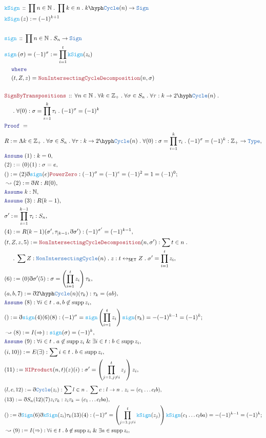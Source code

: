 \documentclass[12pt]{scrartcl}
\newcommand{\TYPE}[1]{\textcolor{NavyBlue}{\mathtt{#1}}}
\newcommand{\FUNC}[1]{\textcolor{Cerulean}{\mathtt{#1}}}
\newcommand{\LOGIC}[1]{\textcolor{Blue}{\mathtt{#1}}}
\newcommand{\THM}[1]{\textcolor{Maroon}{\mathtt{#1}}}
\renewcommand{\.}{\; . \;}
\newcommand{\de}{: \kern 0.1pc =}
\newcommand{\where}{\LOGIC{where}}
\newcommand{\Act}[1]{\left( #1 \right)}
\newcommand{\Theorem}[2]{& \THM{#1} \, :: \, #2 \\ & \Proof = \\ }
\newcommand{\DeclareFunc}[2]{& \FUNC{#1} \, :: \, #2 \\}
\newcommand{\DefineFunc}[3]{&  \FUNC{#1}\Act{#2} \de #3 \\}
\newcommand{\DefineNamedFunc}[4]{&  \FUNC{#1}\Act{#2} = #3 \de #4 \\}
\newcommand{\NewLine}{\\ & \kern 1pc}
\newcommand{\Page}[1]{ \begin{align*} #1 \end{align*}   }
\newcommand{ \bd }{ \ByDef }
\renewcommand{\And}{\; \& \;}
\newcommand{\Type}{\TYPE{Type}}
\newcommand{\NNInt}{\mathbb{Z}_{+} }
\newcommand{\Nat}{\mathbb{N} }
\DeclareMathOperator*{\supp}{supp}
\newcommand{\ToBij}{\leftrightarrow}
\newcommand{\Say}[3]{& #1 \de #2 : #3, \\}
\newcommand{\Conclude}[3]{& #1 \de #2 : #3; \\}
\newcommand{\Derive}[3]{& \leadsto #1 \de #2 : #3, \\}
\newcommand{\Assume}[2]{& \LOGIC{Assume} \; #1 : #2, \\}
\newcommand{\ByDef}{\eth}
\newcommand{\Proof}{\LOGIC{Proof} \; }
\newcommand{\SET}{\mathsf{SET}}
\begin{document}
\Page{
	\DeclareFunc{kSign}{\prod n \in \Nat \. \prod k \in n \. k\hyph \TYPE{Cycle}(n) \to \TYPE{Sign}}
	\DefineFunc{kSign}{z}{(-1)^{k+1}}
	\\
	\DeclareFunc{sign}{\prod n \in \Nat \. S_n \to \TYPE{Sign}}
	\DefineNamedFunc{sign}{\sigma}{(-1)^\sigma}{\prod^t_{i=1} \FUNC{kSign}(z_i) 
	\NewLine \where \NewLine
	(t,Z,z) = \THM{NonIntersectingCycleDecomposition}(n,\sigma)
	}
	\\
	\Theorem{SignByTranspositions}{\forall n \in \Nat \. \forall k \in \NNInt \. \forall \sigma \in S_n \.
		\forall \tau : k \to 2\hyph\TYPE{Cycle}(n) \. 
		\NewLine \.
		\forall (0) : \sigma = \prod^k_{i=1} \tau_i \.
		(-1)^{\sigma} = (-1)^k 
	}
	\Say{R}{\Lambda k \in \NNInt \. \forall \sigma \in S_n \. \forall \tau : k \to 2\hyph\TYPE{Cycle}(n) \. 
	 \forall (0) : \sigma = \prod^k_{i=1} \tau_i \. (-1)^{\sigma} = (-1)^k
	}{\NNInt \to \Type}
	\Assume{(1)}{k = 0}
	\Say{(2)}{(0)(1)}{\sigma = e}
	\Conclude{()}{ (2)\bd \FUNC{sign}(e)\THM{PowerZero}}{ (-1)^{\sigma} = (-1)^e = (-1)^2 = 1 = (-1)^0}
	\Derive{(2)}{\bd R}{R(0)}
	\Assume{k}{\Nat}
	\Assume{(3)}{R(k-1)}
	\Say{\sigma'}{ \prod^{k-1}_{i=1} \tau_{i}}{S_n}
	\Say{(4)}{R(k-1)(\sigma',\tau_{|k-1},\bd \sigma')}{ (-1)^{\sigma'} = (-1)^{k-1} }
	\Say{(t,Z,z,5)}{\THM{NonIntersectingCycleDecomposition}(n,\sigma')}
	{\sum t \in n \. 
		\NewLine \.
		\sum Z : \TYPE{NonIntersectingCycle}(n) \. z  : t  \ToBij_{\SET} Z 
		\.  \sigma' = \prod^t_{i=1} z_i }
	\Say{(6)}{(0)\bd \sigma' (5)}{ \sigma =  \left(\prod^t_{i=1} z_i \right) \tau_k   }
	\Say{(a,b,7)}{\bd 2\hyph\TYPE{Cycle}(n)(\tau_k)}{\tau_k = (ab)}
	\Assume{(8)}{\forall i \in t \. a,b \not \in \supp z_i}
	\Conclude{()}{\bd \FUNC{sign}(4)(6)(8)}{(-1)^\sigma = \FUNC{sign}\left( \prod^t_{i=1} z_i \right)\FUNC{sign}(\tau_k) =
	  -(-1)^{k-1} = (-1)^k
	}
	\Derive{(8)}{I(\Rightarrow)}{ \FUNC{sign}(\sigma) = (-1)^k   }
	\Assume{(9)}{\forall i \in t \. a \not \in \supp z_i \And \exists i \in t : b \in \supp z_i }
	\Say{(i,10))}{E(\exists)}{\sum i \in t \. b \in \supp z_i}
	\Say{(11) }{  \THM{NIProduct}(n,t)(z)(i)    }
	{ \sigma' = \left( \prod_{j = 1, j \neq i}^t z_j \right)z_i }
}\Page{
	\Say{(l,c,12)}{\bd \TYPE{Cycle}(z_i)}{ \sum l \in n \. \sum c : l \to n \. z_i = (c_1 \ldots c_l b)    }
	\Say{(13)}{\bd S_n(12)(7) z_i \tau_k  }{ z_i \tau_k = (c_1 \ldots c_l b a)}
	\Conclude{()}{ \bd \FUNC{Sign}(6)\bd \FUNC{kSign}(z_i) \tau_k(13)(4) }{ 
		(-1)^\sigma = \left(\prod^t_{j=1 : j \neq i} \FUNC{kSign}(z_j)\right) 
		\FUNC{kSign}(c_1 \ldots c_l b a) =  -(-1)^{k-1} = (-1)^k   }
	\Derive{(9)}{I(\Rightarrow)}{\forall i \in t \. b \not \in \supp z_i \And \exists a \in \supp z_i 
}}
\end{document}
